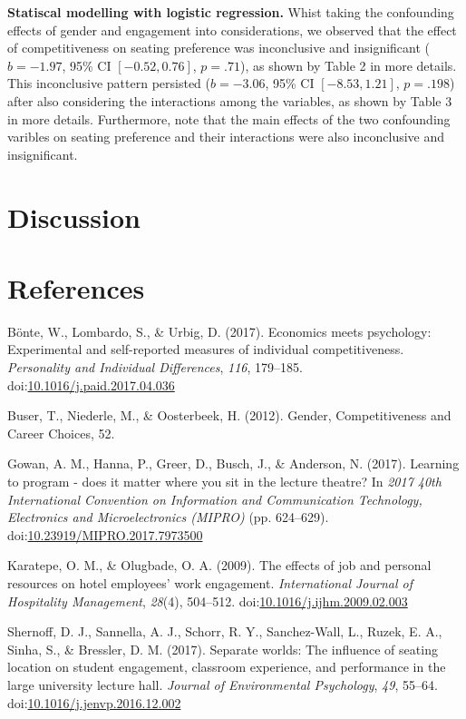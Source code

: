 \documentclass[man]{apa6}
\begin{document}
\textbf{Statiscal modelling with logistic regression.} Whist taking the confounding effects of gender and engagement into considerations, we observed that the effect of competitiveness on seating preference was inconclusive and insignificant (\(b = -1.97\), 95\% CI \([-0.52, 0.76]\), \(p = .71\)), as shown by Table 2 in more details. This inconclusive pattern persisted (\(b = -3.06\), 95\% CI \([-8.53, 1.21]\), \(p = .198\)) after also considering the interactions among the variables, as shown by Table 3 in more details. Furthermore, note that the main effects of the two confounding varibles on seating preference and their interactions were also inconclusive and insignificant.

\hypertarget{discussion}{%
\section{Discussion}\label{discussion}}

\newpage

\hypertarget{references}{%
\section{References}\label{references}}

\begingroup
\setlength{\parindent}{-0.5in}
\setlength{\leftskip}{0.5in}

\hypertarget{refs}{}
\leavevmode\hypertarget{ref-bonte_economics_2017}{}%
Bönte, W., Lombardo, S., \& Urbig, D. (2017). Economics meets psychology: Experimental and self-reported measures of individual competitiveness. \emph{Personality and Individual Differences}, \emph{116}, 179--185. doi:\href{https://doi.org/10.1016/j.paid.2017.04.036}{10.1016/j.paid.2017.04.036}

\leavevmode\hypertarget{ref-buser_gender_2012}{}%
Buser, T., Niederle, M., \& Oosterbeek, H. (2012). Gender, Competitiveness and Career Choices, 52.

\leavevmode\hypertarget{ref-gowan_learning_2017}{}%
Gowan, A. M., Hanna, P., Greer, D., Busch, J., \& Anderson, N. (2017). Learning to program - does it matter where you sit in the lecture theatre? In \emph{2017 40th International Convention on Information and Communication Technology, Electronics and Microelectronics (MIPRO)} (pp. 624--629). doi:\href{https://doi.org/10.23919/MIPRO.2017.7973500}{10.23919/MIPRO.2017.7973500}

\leavevmode\hypertarget{ref-karatepe_effects_2009}{}%
Karatepe, O. M., \& Olugbade, O. A. (2009). The effects of job and personal resources on hotel employees' work engagement. \emph{International Journal of Hospitality Management}, \emph{28}(4), 504--512. doi:\href{https://doi.org/10.1016/j.ijhm.2009.02.003}{10.1016/j.ijhm.2009.02.003}

\leavevmode\hypertarget{ref-shernoff_separate_2017}{}%
Shernoff, D. J., Sannella, A. J., Schorr, R. Y., Sanchez-Wall, L., Ruzek, E. A., Sinha, S., \& Bressler, D. M. (2017). Separate worlds: The influence of seating location on student engagement, classroom experience, and performance in the large university lecture hall. \emph{Journal of Environmental Psychology}, \emph{49}, 55--64. doi:\href{https://doi.org/10.1016/j.jenvp.2016.12.002}{10.1016/j.jenvp.2016.12.002}

\endgroup
\end{document}
